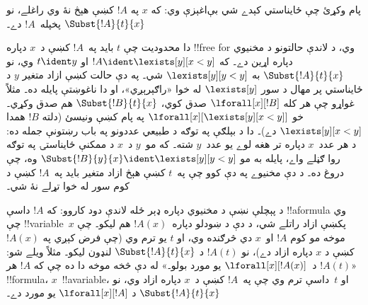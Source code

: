 \documentclass[../../../include/open-logic-section]{subfiles}
\begin{document}
\begin{explain}
پام وکړئ چې ځايناستي کېدے شي بې‌اغېزې وي: که $x$ په $!A$ کښې هېڅ
نۀ وي راغلے، نو $\Subst{!A}{t}{x}$ پخپله~$!A$ دے۔

دا محدوديت چې $t$ بايد په~$!A$ کښې د~$x$ دپاره !!{free for} وي، د
لاندې حالتونو د مخنيوي دپاره اړين دے۔ که $!A \ident
\lexists[y][x < y]$ او $t \ident y$ وي، نو $\Subst{!A}{t}{x}$ به
$\lexists[y][y < y]$ شي۔ په دې حالت کښې ازاد متغير $y$ د ځايناستي
پر مهال د سور $\lexists[y]$ له خوا «راګېرېږي»، او دا ناغوښتې پايله
ده۔ مثلاً غواړو چې هر کله $\lforall[x][!B]$ صدق کوي،
$\Subst{!B}{t}{x}$ هم صدق وکړي۔ خو
$\lforall[x][\lexists[y][x < y]]$ په پام کښې ونيسئ (دلته $!B$ همدا
$\lexists[y][x < y]$ دے)۔ دا د بېلګې په توګه د طبيعي عددونو په باب
رښتونې جمله ده: د هر عدد~$x$ دپاره تر هغه لوے يو عدد~$y$ شته۔ که
مو~$y$ د~$x$ د ممکنې ځايناستۍ په توګه روا ګڼلے واے، پايله به مو
$\Subst{!B}{y}{x} \ident \lexists[y][y < y]$ وه، چې دروغ ده۔ د دې
مخنيوے په دې کوو چې په~$t$ کښې هېڅ ازاد متغير بايد په~$!A$ کښې د
کوم سور له خوا تړلے نۀ شي۔
\end{explain}

د پېچلې نښې د مخنيوي دپاره ډېر ځله لاندې دود کاروو: که $!A$ داسې
!!a{formula} وي چې !!{variable}~$x$ پکښې ازاد راتلے شي، د دې د
ښودلو دپاره~$!A(x)$ هم ليکو۔ چې موخه مو کوم $!A$ او~$x$ دي څرګنده
وي، او $t$ يو ترم وي (چې فرض کېږي په $!A(x)$ کښې د $x$ دپاره ازاد
دے)، نو $!A(t)$ د $\Subst{!A}{t}{x}$ لنډون ليکو۔ مثلاً ويلے شو:
«$!A(t)$ د~$\lforall[x][!A(x)]$ يو مورد بولو۔» له دې څخه موخه دا
ده چې که $!A$ هر !!{formula}، $x$~!!a{variable}، او $t$~داسې ترم وي
چې په~$!A$ کښې د~$x$ دپاره ازاد وي، نو $\Subst{!A}{t}{x}$ د
$\lforall[x][!A]$ يو مورد دے۔
\end{document}
